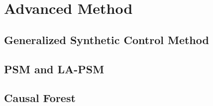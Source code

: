 \documentclass{article}
\begin{document}
\section{Advanced Method}


\subsection{Generalized Synthetic Control Method}


\subsection{PSM and LA-PSM}


\subsection{Causal Forest}

\pagebreak


% 
\end{document}
